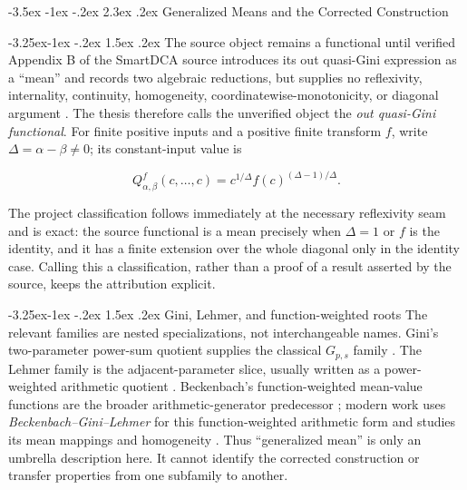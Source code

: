 \documentclass[12pt,a4paper,oneside]{report}
\makeatletter
\renewcommand\section{\@startsection{section}{1}{\z@}%
  {-3.5ex \@plus -1ex \@minus -.2ex}%
  {2.3ex \@plus .2ex}%
  {\normalfont\fontsize{14}{17}\selectfont\bfseries}}
\renewcommand\subsection{\@startsection{subsection}{2}{\z@}%
  {-3.25ex\@plus -1ex \@minus -.2ex}%
  {1.5ex \@plus .2ex}%
  {\normalfont\fontsize{12}{15}\selectfont\bfseries}}
\makeatother
\begin{document}
\section{Generalized Means and the Corrected Construction}

\subsection{The source object remains a functional until verified}
\label{sec:lit-mean-source-functional}
Appendix B of the SmartDCA source introduces its out quasi-Gini expression as a
``mean'' and records two algebraic reductions, but supplies no reflexivity,
internality, continuity, homogeneity, coordinatewise-monotonicity, or diagonal
argument \citep{calvet2023smartdca}. The thesis therefore calls the unverified
object the \emph{out quasi-Gini functional}. For finite positive inputs and a
positive finite transform $f$, write $\Delta=\alpha-\beta\ne0$; its
constant-input value is

\[
  Q_{\alpha,\beta}^{f}(c,\ldots,c)
  =c^{1/\Delta}f(c)^{(\Delta-1)/\Delta}.
\]

The project classification follows immediately at the necessary reflexivity
seam and is exact: the source functional is a mean precisely when $\Delta=1$ or
$f$ is the identity, and it has a finite extension over the whole diagonal
only in the identity case. Calling this a classification, rather than a proof
of a result asserted by the source, keeps the attribution explicit.

\subsection{Gini, Lehmer, and function-weighted roots}
\label{sec:lit-mean-generalized-roots}
The relevant families are nested specializations, not interchangeable names.
Gini's two-parameter power-sum quotient supplies the classical $G_{p,s}$
family \citep{gini1938}. The Lehmer family is the adjacent-parameter slice,
usually written as a power-weighted arithmetic quotient
\citep{lehmer1971,chuzhao2015}. Beckenbach's function-weighted mean-value functions are
the broader arithmetic-generator predecessor \citep{beckenbach1950}; modern
work uses \emph{Beckenbach--Gini--Lehmer} for this function-weighted
arithmetic form and studies its mean mappings and homogeneity
\citep{matkowskiwrobel2020}. Thus ``generalized mean'' is only an umbrella
description here. It cannot identify the corrected construction or transfer
properties from one subfamily to another.
\end{document}
